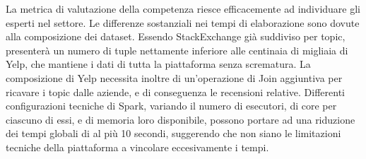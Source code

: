 La metrica di valutazione della competenza riesce efficacemente ad individuare gli esperti nel settore. Le differenze sostanziali nei tempi di elaborazione sono dovute alla composizione dei dataset. Essendo StackExchange già suddiviso per topic, presenterà un numero di tuple nettamente inferiore alle centinaia di migliaia di Yelp, che mantiene i dati di tutta la piattaforma senza scrematura. La composizione di Yelp necessita inoltre di un'operazione di Join aggiuntiva per ricavare i topic dalle aziende, e di conseguenza le recensioni relative. Differenti configurazioni tecniche di Spark, variando il numero di esecutori, di core per ciascuno di essi, e di memoria loro disponibile, possono portare ad una riduzione dei tempi globali di al più 10 secondi, suggerendo che non siano le limitazioni tecniche della piattaforma a vincolare eccesivamente i tempi.